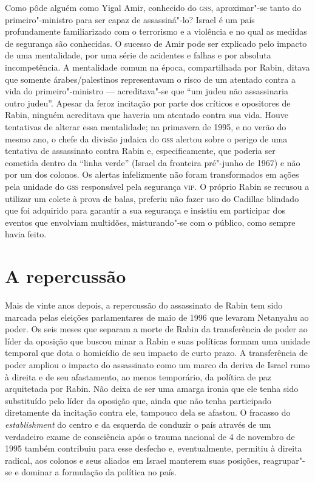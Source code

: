 Como pôde alguém como Yigal Amir, conhecido do \textsc{gss}, aproximar"-se tanto
do primeiro"-ministro para ser capaz de assassiná"-lo? Israel é
um país profundamente familiarizado com o terrorismo e a violência e no
qual as medidas de segurança são conhecidas. O sucesso de Amir pode ser
explicado pelo impacto de uma mentalidade, por uma série de acidentes e
falhas e por absoluta incompetência. A mentalidade comum na época,
compartilhada por Rabin, ditava que somente árabes/palestinos
representavam o risco de um atentado contra a vida do primeiro"-ministro
--- acreditava"-se que ``um judeu não assassinaria outro judeu''. Apesar
da feroz incitação por parte dos críticos e opositores de Rabin, ninguém
acreditava que haveria um atentado contra sua vida. Houve tentativas de
alterar essa mentalidade; na primavera de 1995, e no verão do mesmo ano,
o chefe da divisão judaica do \textsc{gss} alertou sobre o perigo de uma
tentativa de assassinato contra Rabin e, especificamente, que poderia
ser cometida dentro da ``linha verde'' (Israel da fronteira pré"-junho de
1967) e não por um dos colonos. Os alertas infelizmente não foram
transformados em ações pela unidade do \textsc{gss} responsável pela segurança
\textsc{vip}. O próprio Rabin se recusou a utilizar um colete à prova de balas,
preferiu não fazer uso do Cadillac blindado que foi adquirido para
garantir a sua segurança e insistiu em participar dos eventos que
envolviam multidões, misturando"-se com o público, como sempre havia
feito.

\section{A repercussão}

Mais de vinte anos depois, a repercussão do assassinato de Rabin tem
sido marcada pelas eleições parlamentares de maio de 1996 que levaram
Netanyahu ao poder. Os seis meses que separam a morte de Rabin da
transferência de poder ao líder da oposição que buscou minar a Rabin e
suas políticas formam uma unidade temporal que dota o homicídio de
seu impacto de curto prazo. A transferência de poder ampliou o impacto
do assassinato como um marco da deriva de Israel rumo à direita e de seu
afastamento, ao menos temporário, da política de paz arquitetada por
Rabin. Não deixa de ser uma amarga ironia que ele tenha sido substituído
pelo líder da oposição que, ainda que não tenha participado diretamente
da incitação contra ele, tampouco dela se afastou. O fracasso do
\emph{establishment} do centro e da esquerda de conduzir o país através
de um verdadeiro exame de consciência após o trauma nacional de 4 de
novembro de 1995 também contribuiu para esse desfecho e, eventualmente,
permitiu à direita radical, aos colonos e seus aliados em Israel
manterem suas posições, reagrupar"-se e dominar a formulação da política
no país.

